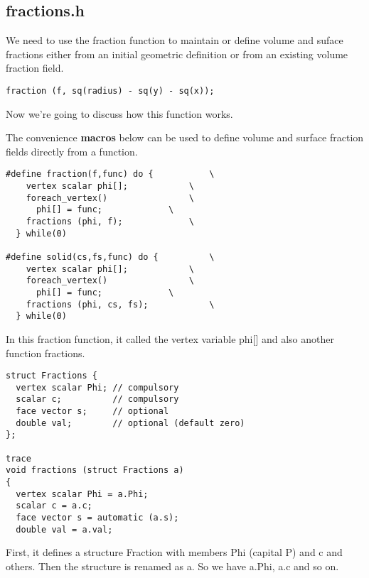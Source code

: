 \documentclass[12pt]{article} %
\begin{document}
\subsection{fractions.h}
\hspace{5mm}We need to use the fraction function to maintain or define volume and suface fractions either from an initial geometric definition or from an existing volume fraction field.\par
\begin{lstlisting}[style=CStyle]
fraction (f, sq(radius) - sq(y) - sq(x)); 
\end{lstlisting}\par
Now we're going to discuss how this function works.\par
The convenience \textbf{macros} below can be used to define volume and surface fraction fields directly from a function.\par
\begin{lstlisting}[style=CStyle]
#define fraction(f,func) do {			\
    vertex scalar phi[];			\
    foreach_vertex()				\
      phi[] = func;				\
    fractions (phi, f);				\
  } while(0)

#define solid(cs,fs,func) do {			\
    vertex scalar phi[];			\
    foreach_vertex()				\
      phi[] = func;				\
    fractions (phi, cs, fs);			\
  } while(0)
\end{lstlisting}\par
In this fraction function, it called the vertex variable phi[] and also another function fractions.
\begin{lstlisting}[style=CStyle]
struct Fractions {
  vertex scalar Phi; // compulsory
  scalar c;          // compulsory
  face vector s;     // optional
  double val;        // optional (default zero)
};

trace
void fractions (struct Fractions a)
{
  vertex scalar Phi = a.Phi;
  scalar c = a.c;
  face vector s = automatic (a.s);
  double val = a.val;
\end{lstlisting}\par

First, it defines a structure Fraction with members Phi (capital P) and c and others.
Then the structure is renamed as a. So we have a.Phi, a.c and so on. \par
\end{document}
